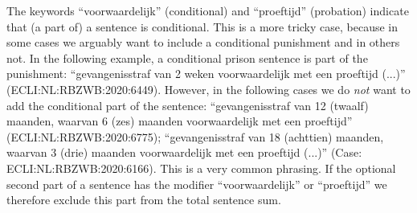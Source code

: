 \documentclass[a4paper]{article}
\begin{document}
The keywords ``voorwaardelijk'' (conditional) and ``proeftijd'' (probation) indicate that (a part of) a sentence is conditional.
This is a more tricky case, because in some cases we arguably want to include a conditional punishment and in others not.
In the following example, a conditional prison sentence is part of the punishment:
``gevangenisstraf van 2 weken voorwaardelijk met een proeftijd (...)'' (ECLI:NL:RBZWB:2020:6449).
However, in the following cases we do \emph{not} want to add the conditional part of the sentence: ``gevangenisstraf van 12 (twaalf) maanden, waarvan 6 (zes) maanden voorwaardelijk met een proeftijd'' (ECLI:NL:RBZWB:2020:6775); 
 ``gevangenisstraf van 18 (achttien) maanden, waarvan 3 (drie) maanden voorwaardelijk met een proeftijd (...)'' (Case: ECLI:NL:RBZWB:2020:6166).
This is a very common phrasing.
If the optional second part of a sentence has the modifier ``voorwaardelijk'' or ``proeftijd'' we therefore exclude this part from the total sentence sum.
\end{document}
